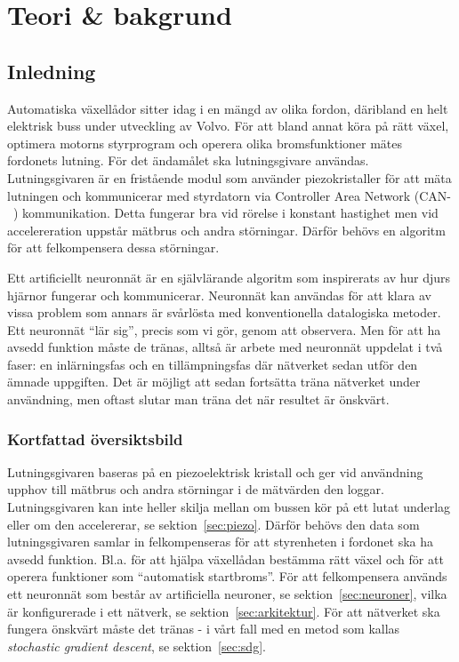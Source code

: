 \section{Teori \& bakgrund}
\subsection{Inledning}
Automatiska växellådor sitter idag i en mängd av olika fordon,
däribland en helt elektrisk buss under utveckling av Volvo.
För att bland annat köra på rätt växel, optimera motorns styrprogram
och operera olika bromsfunktioner %
mätes fordonets lutning.
För det ändamålet ska lutningsgivare användas.
Lutningsgivaren är en fristående modul som använder piezokristaller för att
mäta lutningen och kommunicerar med styrdatorn via
Controller Area Network (CAN-~) kommunikation.
Detta fungerar bra vid rörelse i konstant hastighet
men vid accelereration uppstår mätbrus och andra störningar.
Därför behövs en algoritm för att felkompensera dessa störningar.

Ett artificiellt neuronnät är en självlärande algoritm som inspirerats av
hur djurs hjärnor fungerar och kommunicerar.
Neuronnät kan användas för att klara av vissa problem som annars är svårlösta
med konventionella datalogiska metoder.
Ett neuronnät ``lär sig'', precis som vi gör, genom att observera.
Men för att ha avsedd funktion måste de tränas, alltså är arbete med neuronnät
uppdelat i två faser: en inlärningsfas och en tillämpningsfas där nätverket sedan
utför den ämnade uppgiften.
\autocite{copeland16}
Det är möjligt att sedan fortsätta träna nätverket
under användning, men oftast slutar man träna det när resultet är önskvärt.
\autocite{wiki-neuronnat}

\subsubsection{Kortfattad översiktsbild}
Lutningsgivaren baseras på en piezoelektrisk kristall och ger vid användning
upphov till mätbrus och andra störningar i de mätvärden den loggar.
Lutningsgivaren kan inte heller skilja mellan om bussen kör på ett lutat underlag
eller om den accelererar, se sektion~\ref{sec:piezo}.
Därför behövs den data som lutningsgivaren samlar in felkompenseras för att
styrenheten i fordonet ska ha avsedd funktion. Bl.a. för att hjälpa växellådan
bestämma rätt växel och för att operera funktioner som ``automatisk startbroms''.
För att felkompensera används ett neuronnät som består av artificiella
neuroner, se sektion~\ref{sec:neuroner}, vilka är konfigurerade i ett nätverk,
se sektion~\ref{sec:arkitektur}. För att nätverket ska fungera önskvärt måste
det tränas - i vårt fall med en metod som kallas \emph{stochastic gradient descent},
se sektion~\ref{sec:sdg}.

